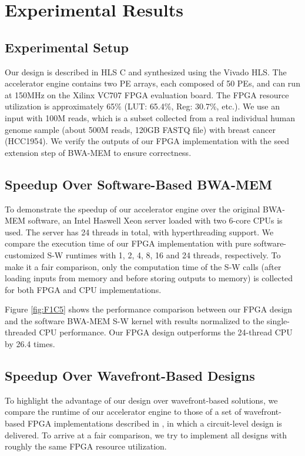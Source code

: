 \section{Experimental Results} 
\label{sec:results}

\subsection{Experimental Setup}

Our design is described in HLS C and synthesized using the Vivado HLS.
The accelerator engine contains two PE arrays, each composed of 50 PEs, and can run at 150MHz on the Xilinx VC707 FPGA evaluation board.
The FPGA resource utilization is approximately 65\% (LUT: 65.4\%, Reg: 30.7\%, etc.). 
We use an input with 100M reads, which is a subset collected from a real individual human genome sample (about 500M reads, 120GB FASTQ file) with breast cancer (HCC1954). 
We verify the outputs of our FPGA implementation with the seed extension step of BWA-MEM to ensure correctness. 

\subsection{Speedup Over Software-Based BWA-MEM}

To demonstrate the speedup of our accelerator engine over the original BWA-MEM software, 
an Intel Haswell Xeon server loaded with two 6-core CPUs is used.
The server has 24 threads in total, with hyperthreading support.
We compare the execution time of our FPGA implementation with pure software-customized S-W runtimes with 1, 2, 4, 8, 16 and 24 threads, respectively.
To make it a fair comparison, only the computation time of the S-W calls (after loading inputs from memory and before storing outputs to memory) is collected for both FPGA and CPU implementations.

Figure \ref{fig:F1C5} shows the performance comparison between our FPGA design and the software BWA-MEM S-W kernel with results normalized to the single-threaded CPU performance.
Our FPGA design outperforms the 24-thread CPU by 26.4 times.

\subsection{Speedup Over Wavefront-Based Designs}

To highlight the advantage of our design over wavefront-based solutions, 
we compare the runtime of our accelerator engine to those of a set of wavefront-based FPGA implementations described in \cite{Zhang2007}, in which a circuit-level design is delivered. To arrive at a fair comparison, we try to implement all designs with roughly the same FPGA resource utilization.

